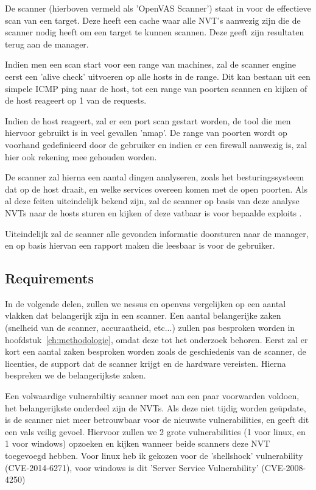 De scanner (hierboven vermeld als 'OpenVAS Scanner') staat in voor de effectieve scan van een target. Deze heeft een cache waar alle NVT's aanwezig zijn die de scanner nodig heeft om een target te kunnen scannen. Deze geeft zijn resultaten terug aan de manager. 

Indien men een scan start voor een range van machines, zal de scanner engine eerst een 'alive check' uitvoeren op alle hosts in de range. Dit kan bestaan uit een simpele ICMP ping naar de host, tot een range van poorten scannen en kijken of de host reageert op 1 van de requests. 

Indien de host reageert, zal er een port scan gestart worden, de tool die men hiervoor gebruikt is in veel gevallen 'nmap'. De range van poorten wordt op voorhand gedefinieerd door de gebruiker en indien er een firewall aanwezig is, zal hier ook rekening mee gehouden worden. 

De scanner zal hierna een aantal dingen analyseren, zoals het besturingssysteem dat op de host draait, en welke services overeen komen met de open poorten. Als al deze feiten uiteindelijk bekend zijn, zal de scanner op basis van deze analyse NVTs naar de hosts sturen en kijken of deze vatbaar is voor bepaalde exploits \textcite{Qualys}.

Uiteindelijk zal de scanner alle gevonden informatie doorsturen naar de manager, en op basis hiervan een rapport maken die leesbaar is voor de gebruiker.

\subsection{Requirements}


In de volgende delen, zullen we nessus en openvas vergelijken op een aantal vlakken dat belangerijk zijn in een scanner. Een aantal belangerijke zaken (snelheid van de scanner, accuraatheid, etc...) zullen pas besproken worden in hoofdstuk~\ref{ch:methodologie}, omdat deze tot het onderzoek behoren. Eerst zal er kort een aantal zaken besproken worden zoals de geschiedenis van de scanner, de licenties, de support dat de scanner krijgt en de hardware vereisten. Hierna bespreken we de belangerijkste zaken.

Een volwaardige vulnerabiltiy scanner moet aan een paar voorwarden voldoen, het belangerijkste onderdeel zijn de NVTs. Als deze niet tijdig worden geüpdate, is de scanner niet meer betrouwbaar voor de nieuwste vulnerabilities, en geeft dit een vals veilig gevoel. Hiervoor zullen we 2 grote vulnerabilities (1 voor linux, en 1 voor windows) opzoeken en kijken wanneer beide scanners deze NVT toegevoegd hebben. Voor linux heb ik gekozen voor de 'shellshock' vulnerability (CVE-2014-6271), voor windows is dit 'Server Service Vulnerability' (CVE-2008-4250)

